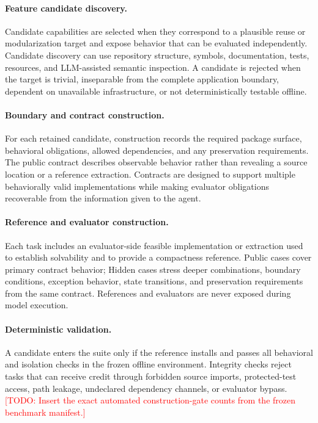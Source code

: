 \documentclass[acmsmall,screen,review,anonymous]{acmart}
\newcommand{\draftnote}[1]{\textcolor{red}{[TODO: #1]}}
\begin{document}
\paragraph{Feature candidate discovery.}
Candidate capabilities are selected when they correspond to a plausible reuse or
modularization target and expose behavior that can be evaluated independently.
Candidate discovery can use repository structure, symbols, documentation, tests,
resources, and LLM-assisted semantic inspection. A candidate is rejected when the
target is trivial, inseparable from the complete application boundary, dependent
on unavailable infrastructure, or not deterministically testable offline.

\paragraph{Boundary and contract construction.}
For each retained candidate, construction records the required package surface,
behavioral obligations, allowed dependencies, and any preservation requirements.
The public contract describes observable behavior rather than revealing a source
location or a reference extraction. Contracts are designed to support multiple
behaviorally valid implementations while making evaluator obligations recoverable
from the information given to the agent.

\paragraph{Reference and evaluator construction.}
Each task includes an evaluator-side feasible implementation or extraction used to
establish solvability and to provide a compactness reference. Public cases cover
primary contract behavior; Hidden cases stress deeper combinations, boundary
conditions, exception behavior, state transitions, and preservation requirements
from the same contract. References and evaluators are never exposed during model
execution.

\paragraph{Deterministic validation.}
A candidate enters the suite only if the reference installs and passes all
behavioral and isolation checks in the frozen offline environment. Integrity
checks reject tasks that can receive credit through forbidden source imports,
protected-test access, path leakage, undeclared dependency channels, or evaluator
bypass. \draftnote{Insert the exact automated construction-gate counts from the
frozen benchmark manifest.}
\end{document}
